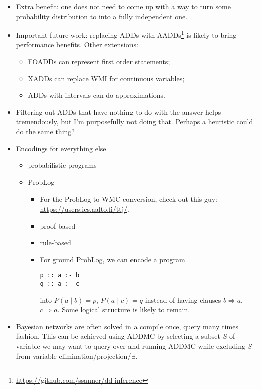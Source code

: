 \documentclass{article}
\theoremstyle{definition}
\theoremstyle{remark}
\begin{document}
\begin{itemize}
\item Extra benefit: one does not need to come up with a way to turn some
  probability distribution to into a fully independent one.
\item Important future work: replacing ADDs with
  AADDs\footnote{\url{https://github.com/ssanner/dd-inference}} is likely to
  bring performance benefits. Other extensions:
  \begin{itemize}
  \item FOADDs can represent first order statements;
  \item XADDs can replace WMI for continuous variables;
  \item ADDs with intervals can do approximations.
  \end{itemize}
\item Filtering out ADDs that have nothing to do with the answer helps
  tremendously, but I'm purposefully not doing that. Perhaps a heuristic could
  do the same thing?
\item Encodings for everything else
  \begin{itemize}
  \item probabilistic programs \cite{DBLP:journals/corr/abs-2005-09089}
  \item ProbLog \cite{DBLP:conf/uai/FierensBTGR11}
    \begin{itemize}
    \item For the ProbLog to WMC conversion, check out this guy:
      \url{https://users.ics.aalto.fi/ttj/}.
    \item proof-based \cite{DBLP:conf/iclp/MantadelisJ10}
    \item rule-based \cite{DBLP:conf/ecai/Janhunen04}
    \item For ground ProbLog, we can encode a program
\begin{verbatim}
p :: a :- b
q :: a :- c
\end{verbatim}
      into $P(a \mid b)=p$, $P(a \mid c)=q$ instead of having clauses $b
      \Rightarrow a$, $c \Rightarrow a$. Some logical structure is likely to
      remain.
    \end{itemize}
  \end{itemize}
\item Bayesian networks are often solved in a compile once, query many times
  fashion. This can be achieved using ADDMC by selecting a subset $S$ of
  variable we may want to query over and running ADDMC while excluding $S$ from
  variable elimination/projection/$\exists$.

\end{itemize}
\end{document}
